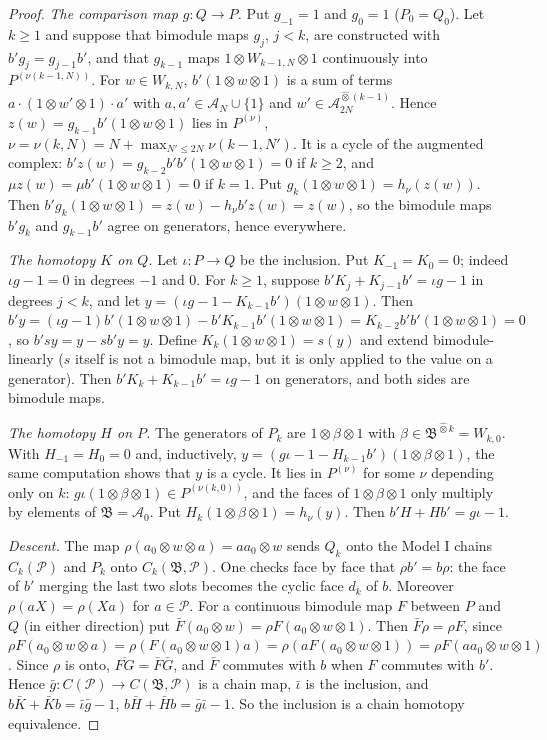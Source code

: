 \documentclass[11pt,oneside,reqno]{article}
\newcommand{\cA}{\mathcal A}
\newcommand{\cP}{\mathcal P}
\newcommand{\hot}{\mathbin{\widehat\otimes}}
\theoremstyle{plain}
\theoremstyle{definition}
\theoremstyle{remark}
\begin{document}
\begin{proof}
\emph{The comparison map \(g:Q\to P\).} Put \(g_{-1}=1\) and \(g_0=1\) (\(P_0=Q_0\)). Let \(k\ge1\) and
suppose that bimodule maps \(g_j\), \(j<k\), are constructed with \(b'g_j=g_{j-1}b'\), and that
\(g_{k-1}\) maps \(1\otimes W_{k-1,N}\otimes1\) continuously into \(P^{(\nu(k-1,N))}\). For \(w\in W_{k,N}\),
\(b'(1\otimes w\otimes1)\) is a sum of terms \(a\cdot(1\otimes w'\otimes1)\cdot a'\) with \(a,a'\in\cA_N\cup\{1\}\) and
\(w'\in\cA_{2N}^{\hot(k-1)}\). Hence \(z(w)=g_{k-1}b'(1\otimes w\otimes1)\) lies in \(P^{(\nu)}\),
\(\nu=\nu(k,N)=N+\max_{N'\le2N}\nu(k-1,N')\). It is a cycle of the augmented complex:
\(b'z(w)=g_{k-2}b'b'(1\otimes w\otimes1)=0\) if \(k\ge2\), and \(\mu z(w)=\mu b'(1\otimes w\otimes1)=0\) if \(k=1\). Put
\(g_k(1\otimes w\otimes1)=h_\nu(z(w))\). Then \(b'g_k(1\otimes w\otimes1)=z(w)-h_\nu b'z(w)=z(w)\), so the
bimodule maps \(b'g_k\) and \(g_{k-1}b'\) agree on generators, hence everywhere.

\emph{The homotopy \(K\) on \(Q\).} Let \(\iota:P\to Q\) be the inclusion. Put \(K_{-1}=K_0=0\);
indeed \(\iota g-1=0\) in degrees \(-1\) and \(0\). For \(k\ge1\), suppose \(b'K_{j}+K_{j-1}b'=\iota g-1\) in
degrees \(j<k\), and let \(y=(\iota g-1-K_{k-1}b')(1\otimes w\otimes1)\). Then
\(b'y=(\iota g-1)b'(1\otimes w\otimes1)-b'K_{k-1}b'(1\otimes w\otimes1)=K_{k-2}b'b'(1\otimes w\otimes1)=0\), so
\(b'sy=y-sb'y=y\). Define \(K_k(1\otimes w\otimes1)=s(y)\) and extend bimodule-linearly (\(s\) itself is
not a bimodule map, but it is only applied to the value on a generator). Then
\(b'K_k+K_{k-1}b'=\iota g-1\) on generators, and both sides are bimodule maps.

\emph{The homotopy \(H\) on \(P\).} The generators of \(P_k\) are \(1\otimes\beta\otimes1\) with
\(\beta\in\mathfrak B^{\hot k}=W_{k,0}\). With \(H_{-1}=H_0=0\) and, inductively,
\(y=(g\iota-1-H_{k-1}b')(1\otimes\beta\otimes1)\), the same computation shows that \(y\) is a cycle. It lies
in \(P^{(\nu)}\) for some \(\nu\) depending only on \(k\): \(g\iota(1\otimes\beta\otimes1)\in P^{(\nu(k,0))}\), and the
faces of \(1\otimes\beta\otimes1\) only multiply by elements of \(\mathfrak B=\cA_0\). Put
\(H_k(1\otimes\beta\otimes1)=h_\nu(y)\). Then \(b'H+Hb'=g\iota-1\).

\emph{Descent.} The map \(\rho(a_0\otimes w\otimes a)=aa_0\otimes w\) sends \(Q_k\) onto the Model I chains
\(C_k(\cP)\) and \(P_k\) onto \(C_k(\mathfrak B,\cP)\). One checks face by face that \(\rho b'=b\rho\): the
face of \(b'\) merging the last two slots becomes the cyclic face \(d_k\) of \(b\). Moreover
\(\rho(aX)=\rho(Xa)\) for \(a\in\cP\). For a continuous bimodule map \(F\) between \(P\) and \(Q\) (in
either direction) put \(\bar F(a_0\otimes w)=\rho F(a_0\otimes w\otimes1)\). Then \(\bar F\rho=\rho F\), since
\(\rho F(a_0\otimes w\otimes a)=\rho(F(a_0\otimes w\otimes1)a)=\rho(aF(a_0\otimes w\otimes1))=\rho F(aa_0\otimes w\otimes1)\).
Since \(\rho\) is onto, \(\overline{FG}=\bar F\bar G\), and \(\bar F\) commutes with \(b\) when \(F\) commutes
with \(b'\). Hence \(\bar g:C(\cP)\to C(\mathfrak B,\cP)\) is a chain map, \(\bar\iota\) is the inclusion, and
\(b\bar K+\bar Kb=\bar\iota\bar g-1\), \(b\bar H+\bar Hb=\bar g\bar\iota-1\). So the inclusion is a chain
homotopy equivalence.
\end{proof}
\end{document}
